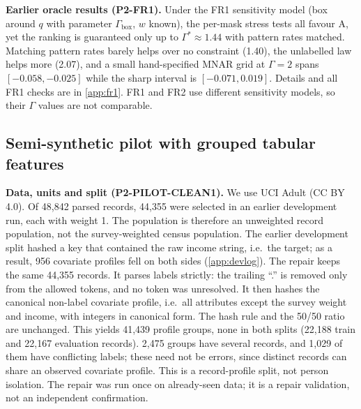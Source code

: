 \documentclass{article}
\theoremstyle{plain}
\theoremstyle{definition}
\theoremstyle{remark}
\begin{document}
\textbf{Earlier oracle results (P2-FR1).} Under the FR1 sensitivity model
(box around $q$ with parameter $\Gamma_{\mathrm{box}}$, $w$ known), the per-mask stress tests all favour A, yet the
ranking is guaranteed only up to $\Gamma^*\approx1.44$ with pattern rates
matched. Matching pattern rates barely helps over no constraint (1.40), the
unlabelled law helps more (2.07), and a small hand-specified MNAR grid at
$\Gamma=2$ spans $[-0.058,-0.025]$ while the sharp interval is
$[-0.071,0.019]$. Details and all FR1 checks are in \cref{app:fr1}. FR1 and
FR2 use different sensitivity models, so their $\Gamma$ values are not
comparable.

\subsection{Semi-synthetic pilot with grouped tabular features}
\label{sec:pilot}

\textbf{Data, units and split (P2-PILOT-CLEAN1).} We use UCI Adult
\cite{becker1996adult} (CC BY 4.0). Of 48{,}842 parsed records, 44{,}355 were
selected in an earlier development run, each with weight 1. The population
is therefore an unweighted record population, not the survey-weighted census
population. The earlier development split hashed a key that contained the raw
income string, i.e.\ the target; as a result, 956 covariate profiles fell on
both sides (\cref{app:devlog}). The repair keeps the same 44{,}355 records. It
parses labels strictly: the trailing ``.'' is removed only from the allowed
tokens, and no token was unresolved. It then hashes the canonical non-label
covariate profile, i.e.\ all attributes except the survey weight and income,
with integers in canonical form. The hash rule and the 50/50 ratio are
unchanged. This yields 41{,}439 profile groups, none in both splits
(22{,}188 train and 22{,}167 evaluation records). 2{,}475 groups have several
records, and 1{,}029 of them have conflicting labels; these need not be
errors, since distinct records can share an observed covariate profile. This
is a record-profile split, not person isolation. The repair was run once on
already-seen data; it is a repair validation, not an independent confirmation.
\end{document}
